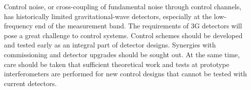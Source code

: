 Control noise, or cross-coupling of fundamental noise through control channels, has historically limited gravitational-wave detectors, especially at the low-frequency end of the measurement band. The requirements of 3G detectors will pose a great challenge to control systems. Control schemes should be developed and tested early as an integral part of detector designs. Synergies with commissioning and detector upgrades should be sought out. At the same time, care should be taken that sufficient theoretical work and tests at prototype interferometers are performed for new control designs that cannot be tested with current detectors.
